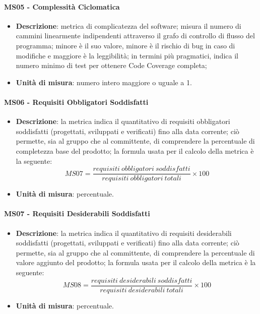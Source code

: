         \paragraph{MS05 - Complessità Ciclomatica}
        \begin{itemize}
            \item \textbf{Descrizione}: metrica di complicatezza del software; misura il numero di cammini linearmente indipendenti attraverso il grafo di controllo di flusso del programma; minore è il suo valore, minore è il rischio di bug in caso di modifiche e maggiore è la leggibilità; in termini più pragmatici, indica il numero minimo di test per ottenere Code Coverage completa;
            \item \textbf{Unità di misura}: numero intero maggiore o uguale a 1.
        \end{itemize}

		\paragraph{MS06 - Requisiti Obbligatori Soddisfatti}
		\begin{itemize}
			\item \textbf{Descrizione}: la metrica indica il quantitativo di requisiti obbligatori soddisfatti (progettati, sviluppati e verificati) fino alla data corrente; ciò permette, sia al gruppo che al committente, di comprendere la percentuale di completezza base del prodotto; la formula usata per il calcolo della metrica è la seguente:
            \[
            MS07 = \frac{requisiti\ obbligatori\ soddisfatti}{requisiti\ obbligatori\ totali} \times 100
            \]
			\item \textbf{Unità di misura}: percentuale.
		\end{itemize}

		\paragraph{MS07 - Requisiti Desiderabili Soddisfatti}
		\begin{itemize}
			\item \textbf{Descrizione}: la metrica indica il quantitativo di requisiti desiderabili soddisfatti (progettati, sviluppati e verificati) fino alla data corrente; ciò permette, sia al gruppo che al committente, di comprendere la percentuale di valore aggiunto del prodotto; la formula usata per il calcolo della metrica è la seguente:
            \[
            MS08 = \frac{requisiti\ desiderabili\ soddisfatti}{requisiti\ desiderabili\ totali} \times 100
            \]
			\item \textbf{Unità di misura}: percentuale.
		\end{itemize}

